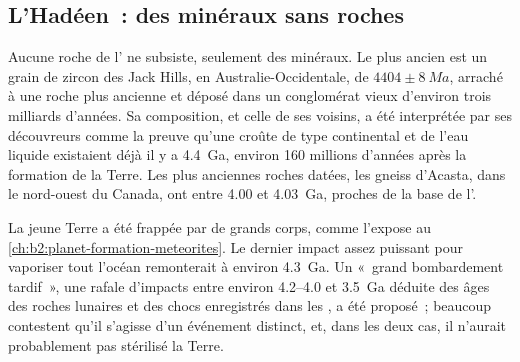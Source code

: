 \begin{omfigure}
\par{}
\end{omfigure}

\subsection*{L'Hadéen~: des minéraux sans roches}

Aucune roche de l' ne subsiste, seulement des minéraux. Le plus ancien est un grain de zircon
des Jack Hills, en Australie-Occidentale, de $4404 \pm \qty{8}{Ma}$, arraché à une roche plus ancienne
et déposé dans un conglomérat vieux d'environ trois milliards d'années. Sa composition, et celle de ses voisins,
a été interprétée par ses découvreurs comme la preuve qu'une croûte de type continental et de l'eau liquide
existaient déjà il y a \qty{4.4}{Ga}, environ 160 millions d'années après la formation de la Terre. Les plus
anciennes roches datées, les gneiss d'Acasta, dans le nord-ouest du Canada, ont entre 4.00 et
\qty{4.03}{Ga}, proches de la base de l'.

La jeune Terre a été frappée par de grands corps, comme l'expose au
\cref{ch:b2:planet-formation-meteorites}. Le dernier impact assez puissant pour vaporiser
tout l'océan remonterait à environ \qty{4.3}{Ga}. Un «~grand bombardement tardif~»,
une rafale d'impacts entre environ 4.2--4.0 et \qty{3.5}{Ga} déduite des âges des roches lunaires
et des chocs enregistrés dans les , a été proposé~; beaucoup contestent qu'il s'agisse
d'un événement distinct, et, dans les deux cas, il n'aurait probablement pas stérilisé la Terre.

